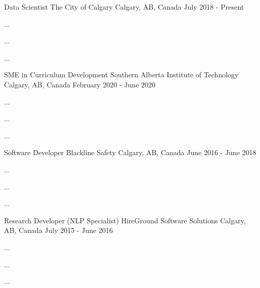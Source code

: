 

\begin{cventries}

  \cventry
  {Data Scientist} %
  {The City of Calgary} %
  {Calgary, AB, Canada} %
  {July 2018 - Present} %
  {
    \begin{cvitems} %
      \item {...}
      \item {...}
      \item {...}
    \end{cvitems}
  }

  \cventry
  {SME in Curriculum Development} %
  {Southern Alberta Institute of Technology} %
  {Calgary, AB, Canada} %
  {February 2020 - June 2020} %
  {
    \begin{cvitems} %
      \item {...}
      \item {...}
      \item {...}
    \end{cvitems}
  }

  \cventry
  {Software Developer} %
  {Blackline Safety} %
  {Calgary, AB, Canada} %
  {June 2016 - June 2018} %
  {
    \begin{cvitems} %
      \item {...}
      \item {...}
      \item {...}
    \end{cvitems}
  }

  \cventry
  {Research Developer (NLP Specialist)} %
  {HireGround Software Solutions} %
  {Calgary, AB, Canada} %
  {July 2015 - June 2016} %
  {
    \begin{cvitems} %
      \item {...}
      \item {...}
      \item {...}
    \end{cvitems}
  }

\end{cventries}
